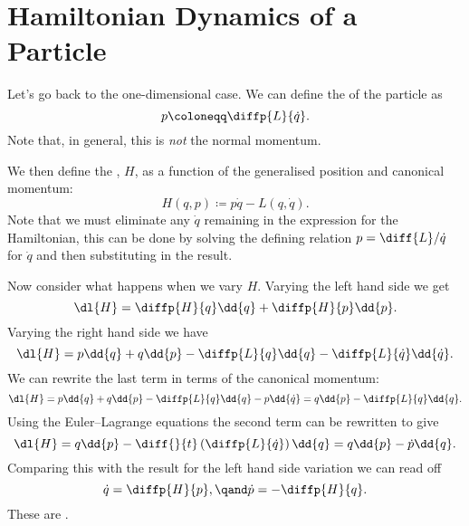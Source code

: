 \documentclass[fleqn]{NotesClass}
\newcommand{\lagrangian}{L}
\begin{document}
    \section{Hamiltonian Dynamics of a Particle}
    Let's go back to the one-dimensional case.
    We can define the  of the particle as
    \begin{equation}
        p \coloneqq \diffp{\lagrangian}{\dot{q}}.
    \end{equation}
    Note that, in general, this is \emph{not} the normal momentum.
    
    We then define the , \(H\), as a function of the generalised position and canonical momentum:
    \begin{equation}
        H(q, p) \coloneqq p\dot{q} - \lagrangian(q, \dot{q}).
    \end{equation}
    Note that we must eliminate any \(\dot{q}\) remaining in the expression for the Hamiltonian, this can be done by solving the defining relation \(p = \diff{\lagrangian}/{\dot{q}}\) for \(\dot{q}\) and then substituting in the result.
    
    Now consider what happens when we vary \(H\).
    Varying the left hand side we get
    \begin{equation}
        \dl{H} = \diffp{H}{q} \dd{q} + \diffp{H}{p} \dd{p}.
    \end{equation}
    Varying the right hand side we have
    \begin{equation}
        \dl{H} = p \dd{q} + q \dd{p} - \diffp{\lagrangian}{q} \dd{q} - \diffp{\lagrangian}{\dot{q}} \dd{\dot{q}}.
    \end{equation}
    We can rewrite the last term in terms of the canonical momentum:
    \begin{equation}
        \dl{H} = p \dd{q} + q \dd{p} - \diffp{\lagrangian}{q} \dd{q} - p \dd{\dot{q}} =  q \dd{p} - \diffp{\lagrangian}{q} \dd{q}.
    \end{equation}
    Using the Euler--Lagrange equations the second term can be rewritten to give
    \begin{equation}
        \dl{H} =  q \dd{p} - \diff{}{t}\left( \diffp{\lagrangian}{\dot{q}} \right) \dd{q} = q \dd{p} - \dot{p} \dd{q}.
    \end{equation}
    Comparing this with the result for the left hand side variation we can read off
    \begin{equation}
        \dot{q} = \diffp{H}{p}, \qand \dot{p} = - \diffp{H}{q}.
    \end{equation}
    These are .
    
\end{document}
